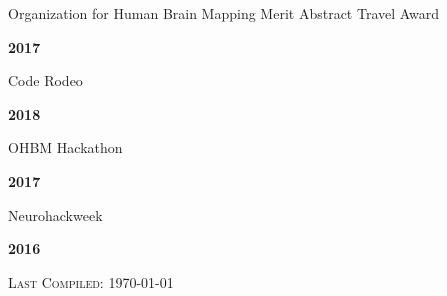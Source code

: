 \documentclass[10pt]{article}
\newenvironment{bottompar}{\par\vspace*{\fill}}{\clearpage}
\newcommand{\headstyle}{\scshape \normalsize \textcolor{light-gray}}
\newcommand{\sectionstyle}{\LARGE \fontfamily{lmr}\selectfont}
\begin{document}
\begin{minipage}[t]{.85\linewidth}
\flushleft
\noindent
Organization for Human Brain Mapping Merit Abstract Travel Award
\end{minipage}
\hfill
\begin{minipage}[t]{.15\linewidth}
\flushright
\noindent
\textsc{\textbf{2017}}
\end{minipage}

\bigskip

\begin{center}\sectionstyle{HACKATHONS}\end{center}

\begin{minipage}[t]{.85\linewidth}
\flushleft
\noindent
Code Rodeo
\end{minipage}
\hfill
\begin{minipage}[t]{.15\linewidth}
\flushright
\noindent
\textsc{\textbf{2018}}
\end{minipage}

\begin{minipage}[t]{.85\linewidth}
\flushleft
\noindent
OHBM Hackathon
\end{minipage}
\hfill
\begin{minipage}[t]{.15\linewidth}
\flushright
\noindent
\textsc{\textbf{2017}}
\end{minipage}

\begin{minipage}[t]{.85\linewidth}
\flushleft
\noindent
Neurohackweek
\end{minipage}
\hfill
\begin{minipage}[t]{.15\linewidth}
\flushright
\noindent
\textsc{\textbf{2016}}
\end{minipage}

\begin{bottompar}
	\begin{center}
		\headstyle{Last Compiled: \today}
	\end{center}
\end{bottompar}
\end{document}
